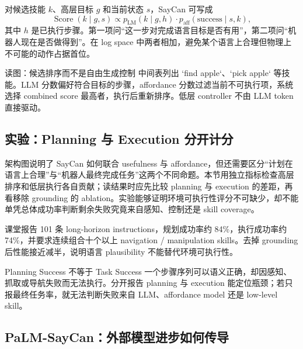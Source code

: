 对候选技能 $k$、高层目标 $g$ 和当前状态 $s$，SayCan 可写成
\begin{equation}
\operatorname{Score}(k\mid g,s)
\propto p_{\mathrm{LM}}(k\mid g,h)
\cdot p_{\mathrm{aff}}(\mathrm{success}\mid s,k),
\end{equation}
其中 $h$ 是已执行步骤。第一项问“这一步对完成语言目标是否有用”，第二项问“机器人现在是否做得到”。在 log space 中两者相加，避免某个语言上合理但物理上不可能的动作占据首位。


\begin{knowledgebox}{读图：候选排序而不是自由生成控制}
中间表列出 `find apple`、`pick apple` 等技能。LLM 分数偏好符合目标的步骤，affordance 分数过滤当前不可执行项，系统选择 combined score 最高者，执行后重新排序。低层 controller 不由 LLM token 直接驱动。
\end{knowledgebox}

\subsection{实验：Planning 与 Execution 分开计分}

架构图说明了 SayCan 如何联合 usefulness 与 affordance，但还需要区分“计划在语言上合理”与“机器人最终完成任务”这两个不同命题。本节用独立指标检查高层排序和低层执行各自贡献；读结果时应先比较 planning 与 execution 的差距，再看移除 grounding 的 ablation。实验能够证明环境可执行性评分不可缺少，却不能单凭总体成功率判断剩余失败究竟来自感知、控制还是 skill coverage。

课堂报告 101 条 long-horizon instructions，规划成功率约 84\%，执行成功率约 74\%，并要求连续组合十个以上 navigation / manipulation skills。去掉 grounding 后性能接近减半，说明语言 plausibility 不能替代环境可执行性。


\begin{warningbox}{Planning Success 不等于 Task Success}
一个步骤序列可以语义正确，却因感知、抓取或导航失败而无法执行。分开报告 planning 与 execution 能定位瓶颈；若只报最终任务率，就无法判断失败来自 LLM、affordance model 还是 low-level skill。
\end{warningbox}

\subsection{PaLM-SayCan：外部模型进步如何传导}

